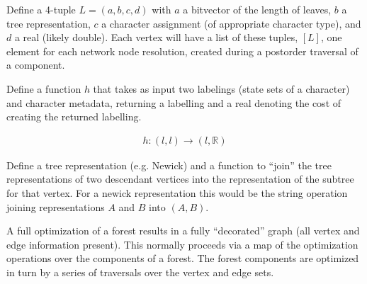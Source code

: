 \documentclass[11pt]{article}
\begin{document}
Define a 4-tuple $L = (a, b, c, d)$ with $a$ a bitvector of the length of leaves, $b$ a tree representation, $c$ a character assignment (of appropriate character type), and $d$ a real (likely double).
Each vertex will have a list of these tuples, $\left[L\right]$, one element for each network node resolution, created during a postorder traversal of a component.
 
Define a function $h$ that takes as input two labelings (state sets of a character) and character metadata, returning a labelling and a real denoting the cost of creating the returned labelling.
 
     \begin{eqnarray*}
     	h : \left(l , l \right) \rightarrow \left( l ,  \mathbb{R} \right)
    \end{eqnarray*}

Define a tree representation (e.g. Newick) and a function to ``join'' the tree representations of two descendant vertices into the representation of the subtree for that vertex.
For a newick representation this would be the string operation joining representations $A$ and $B$ into $\left( A, B \right)$.

A full optimization of a forest results in a fully ``decorated'' graph (all vertex and edge information present).
This normally proceeds via a map of the optimization operations over the components of a forest.
The forest components are optimized in turn by a series of traversals over the vertex and edge sets.
 
\end{document}
